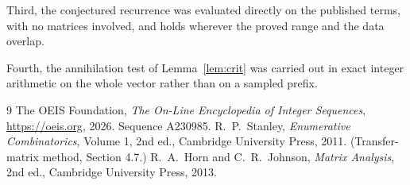 \documentclass[11pt,a4paper]{article}
\theoremstyle{plain}
\theoremstyle{definition}
\begin{document}
Third, the conjectured recurrence was evaluated directly on the published terms, with no
matrices involved, and holds wherever the proved range and the data overlap.

Fourth, the annihilation test of Lemma~\ref{lem:crit} was carried out in exact integer
arithmetic on the whole vector rather than on a sampled prefix.

\begin{thebibliography}{9}
 The OEIS Foundation, \emph{The On-Line Encyclopedia of Integer
Sequences}, \url{https://oeis.org}, 2026. Sequence A230985.
 R.~P.~Stanley, \emph{Enumerative Combinatorics}, Volume 1, 2nd ed.,
Cambridge University Press, 2011. (Transfer-matrix method, Section 4.7.)
 R.~A.~Horn and C.~R.~Johnson, \emph{Matrix Analysis}, 2nd ed., Cambridge
University Press, 2013.
\end{thebibliography}
\end{document}
